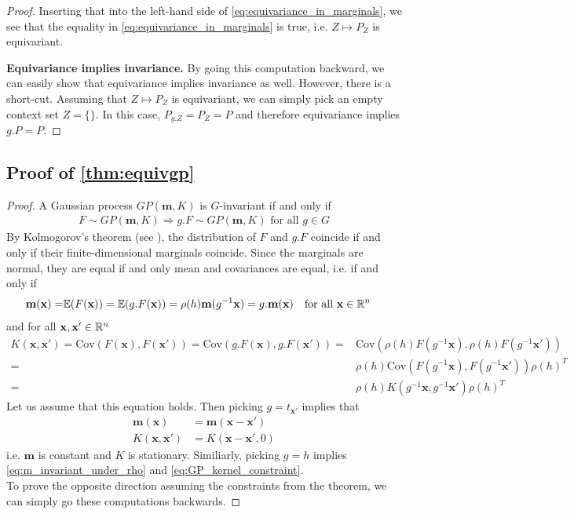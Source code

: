 \begin{proof}
	Inserting that into the left-hand side of \cref{eq:equivariance_in_marginals}, we see that the equality in \cref{eq:equivariance_in_marginals} is true, i.e. $Z\mapsto P_Z$ is equivariant.

	\textbf{Equivariance implies invariance.}
	By going this computation backward, we can easily show that equivariance implies invariance as well.
	However, there is a short-cut.
	Assuming that $Z\mapsto P_Z$ is equivariant, we can simply pick an empty context set $Z=\{\}$.
	In this case, $P_{g.Z}=P_{Z}=P$ and therefore equivariance implies $g.P=P$.
\end{proof}
\subsection{Proof of \cref{thm:equivgp}}
\label{proof:equivgp}
\begin{proof}
	A Gaussian process $GP(\mathbf{m},K)$ is $G$-invariant if and only if \begin{align*} F\sim GP(\mathbf{m},K) \Rightarrow g.F\sim GP(\mathbf{m},K)\text{ for all }g\in G \end{align*} By Kolmogorov's theorem (see \textcite{KolmogorowReference}), the distribution of $F$ and $g.F$ coincide if and only if their finite-dimensional marginals coincide.
	Since the marginals are normal, they are equal if and only mean and covariances are equal, i.e. if and only if \begin{align} \mathbf{m}(\mathbf{x})= & \mathbb{E}(F(\mathbf{x})) =\mathbb{E}(g.F(\mathbf{x})) =\rho(h)\mathbf{m}(g^{-1}\mathbf{x}) =g.
              \mathbf{m}(\mathbf{x})\quad\text{for all }\mathbf{x}\in\mathbb{R}^n
	\end{align}
	and for all $\mathbf{x},\mathbf{x}'\in\mathbb{R}^n$
	\begin{align}
		K(\mathbf{x},\mathbf{x}')=\text{Cov}(F(\mathbf{x}),F(\mathbf{x}')) =\text{Cov}(g.F(\mathbf{x}),g.F(\mathbf{x}')) =&\text{Cov}(\rho(h)F(g^{-1}\mathbf{x}),\rho(h)F(g^{-1}\mathbf{x}'))\\ =&\rho(h)\text{Cov}(F(g^{-1}\mathbf{x}),F(g^{-1}\mathbf{x}'))\rho(h)^T\\ =&\rho(h)K(g^{-1}\mathbf{x},g^{-1}\mathbf{x}')\rho(h)^T \end{align} Let us assume that this equation holds.
	Then picking $g=t_{\mathbf{x}'}$ implies that \begin{align*} \mathbf{m}(\mathbf{x})&=\mathbf{m}(\mathbf{x}-\mathbf{x}')\\ K(\mathbf{x},\mathbf{x}')&=K(\mathbf{x}-\mathbf{x}',0) \end{align*} i.e. $\mathbf{m}$ is constant and $K$ is stationary.
	Similiarly, picking $g=h$ implies \cref{eq:m_invariant_under_rho} and \cref{eq:GP_kernel_constraint}.
	\\
	To prove the opposite direction assuming the constraints from the theorem, we can simply go these computations backwards.
\end{proof}

